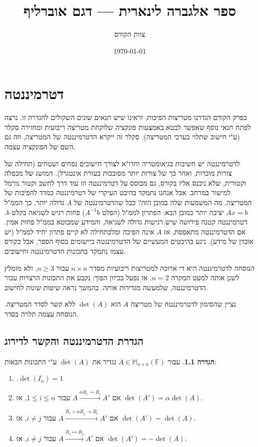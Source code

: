 \documentclass[12pt]{report}
\title{ספר אלגברה לינארית — דגם אוברליף}
\author{צוות הקורס}
\date{\today}
\theoremstyle{plain}
\theoremstyle{definition}
\newtheorem{definition}[theorem]{הגדרה}
\newcommand{\F}{\mathbb{F}}
\newcommand{\M}{\mathbb{M}}
\newcommand{\0}{\mathbf{0}}
\begin{document}
\maketitle

\chapter{דטרמיננטה}\label{ch:determinant}

בפרק הקודם הגדרנו מטריצות הפיכות, וראינו שיש תנאים שונים השקולים להגדרה זו. נרצה לפתח תנאי נוסף שאפשר לבטא באמצעות פונקציה שלוקחת מטריצה ריבועית ומחזירה סקלר (ע"י חישוב שתלוי בערכי המטריצה). סקלר זה ייקרא הדטרמיננטה של המטריצה, וזה גם השם של הפונקציה עצמה.

לדטרמיננטה יש חשיבות בגיאומטריה וחדו"א לצורך חישובים נפחים ושטחים (תחילה של צורות מוכרות, ואחר כך של צורות יותר מסובכות בעזרת אינטגרל). המושג של מכפלה וקטורית, שלא ניכנס אליו בקורס, גם מבוסס על דטרמיננטה וזו עוד דרך לחשב וקטור נורמל למישור במרחב. אבל אנחנו נתמקד בהיבט העיקרי של דטרמיננטה כמדד להפיכות של המטריצה. מה המשמעות שלה במובן הזה? ככל שהדטרמיננטה של
$A$
גדולה יותר, כך הממ"ל
$Ax=b$
יציבה יותר במובן הבא: הפתרון לממ"ל (הפלט
$A^{-1}b$)
פחות רגיש לשגיאה בקלט 
$b$. 
דטרמיננטה קטנה פירושה שיש רגישות גדולה לשגיאה, והמידע שמבוטא בממ"ל פחות אמין. אם הדטרמיננטה מתאפסת, אז $A$
אינה הפיכה ומלכתחילה לא קיים פתרון יחיד לממ"ל (יש אובדן של מידע). ניגע בהיבטים המעשיים של הדטרמיננטה ביישומים בסוף הספר, אבל בקורס עצמו נתמקד בתכונות הדטרמיננטה וחישובים.

הנוסחה לדטרמיננטה היא די ארוכה למטריצות ריבועיות מסדר 
$n\times n$
עבור 
$n\ge 3$,
ולא מומלץ לשנן אותה למעט המקרה 
$n=2$.
אז נפעל בכיוון הפוך: נקבע את התכונות הרצויות עבור הדטרמיננטה, שלמעשה מגדירות אותה. בהמשך נראה שיטות שונות לחישוב.

נציין שהסימון לדטרמיננטה של מטריצה
$A$
הוא 
$\det(A)$
ללא קשר לסדר המטריצה. הנוסחה עצמה תלויה בסדר.

\section{הגדרת הדטרמיננטה והקשר לדירוג}

\begin{definition}\label{def:det}
עבור
$A\in\M_{n\times n}(\F)$
נגדיר את 
$\det(A)$
ע"י התכונות הבאות:

\begin{enumerate}[label=\alph*.]
\item 
$
.\det(I_n)=1
$


\item 
אם
$A\xrightarrow{\alpha R_i\to R_i}A'$
עבור
$1\leq i \leq n$,
אז
$\det(A')=\alpha \det(A)$.

\item 
אם
$A\xrightarrow{R_i+\alpha R_j\to R_i}A'$
עבור
$i\neq j$,
אז
$\det(A')=\det(A)$.


\item 
אם
$A\xrightarrow{R_i\leftrightarrow R_j}A'$
עבור
$i\neq j$,
אז
$\det(A')=-\det(A)$.


\end{enumerate}
\end{definition}
\end{document}

